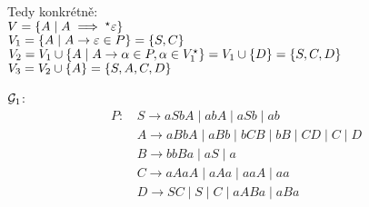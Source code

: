\begin{multicols}{2}
    Tedy konkrétně:\\
    $V = \left\lbrace A \mid A \implies^{\star} \varepsilon \right\rbrace$\\
    $V_1 = \left\lbrace A \mid A \rightarrow \varepsilon \in P \right\rbrace = \left\lbrace S, C \right\rbrace$\\
    $V_2 = V_1 \cup \left\lbrace A \mid A \rightarrow \alpha \in P, \alpha \in V_1^{\star} \right\rbrace = V_1 \cup \left\lbrace D \right\rbrace = \left\lbrace S, C, D \right\rbrace$\\
    $V_3 = V_2 \cup \left\lbrace A \right\rbrace = \left\lbrace S, A, C, D \right\rbrace$

\columnbreak

    $\mathcal{G}_1$:
        \begin{align*}
            P\text{: } & S \rightarrow aSbA \mid abA \mid aSb \mid ab  \\
            & A \rightarrow aBbA \mid aBb \mid bCB \mid bB \mid CD \mid C \mid D \\
            & B \rightarrow bbBa \mid aS \mid a\\
            & C \rightarrow aAaA \mid aAa \mid aaA \mid aa \\
            & D \rightarrow SC \mid S \mid C \mid aABa \mid aBa \\
        \end{align*}

\end{multicols}

